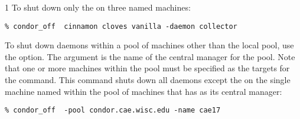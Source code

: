 \begin{ManPage}{\label{man-condor-off}}{1}
To shut down only the  on three named machines:
\begin{verbatim}
% condor_off  cinnamon cloves vanilla -daemon collector
\end{verbatim}

To shut down daemons within a pool of machines other than the
local pool, use the  option.
The argument is the name of the central manager for the pool.
Note that one or more machines within the pool must be
specified as the targets for the command.
This command shuts down all daemons except the 
on the single machine named  within the
pool of machines that has  as
its central manager:
\begin{verbatim}
% condor_off  -pool condor.cae.wisc.edu -name cae17
\end{verbatim}

\end{ManPage}
